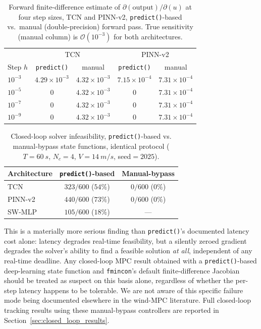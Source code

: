 \begin{table}[H]
\centering
\caption{Forward finite-difference estimate of
$\partial(\text{output})/\partial(u)$ at four step sizes, TCN and
PINN-v2, \texttt{predict()}-based vs.\ manual (double-precision)
forward pass. True sensitivity (manual column) is
$\mathcal{O}(10^{-3})$ for both architectures.}
\label{tab:precision_diagnostic}
\begin{tabular}{lcccc}
\toprule
 & \multicolumn{2}{c}{TCN} & \multicolumn{2}{c}{PINN-v2} \\
Step $h$ & \texttt{predict()} & manual & \texttt{predict()} & manual \\
\midrule
$10^{-3}$ & $4.29\times10^{-3}$ & $4.32\times10^{-3}$ & $7.15\times10^{-4}$ & $7.31\times10^{-4}$ \\
$10^{-5}$ & $0$ & $4.32\times10^{-3}$ & $0$ & $7.31\times10^{-4}$ \\
$10^{-7}$ & $0$ & $4.32\times10^{-3}$ & $0$ & $7.31\times10^{-4}$ \\
$10^{-9}$ & $0$ & $4.32\times10^{-3}$ & $0$ & $7.31\times10^{-4}$ \\
\bottomrule
\end{tabular}
\end{table}

\begin{table}[H]
\centering
\caption{Closed-loop solver infeasibility, \texttt{predict()}-based vs.
manual-bypass state functions, identical protocol ($T=\SI{60}{s}$,
$N_c=4$, $V=\SI{14}{m/s}$, seed$=2025$).}
\label{tab:predict_vs_manual_infeasibility}
\begin{tabular}{lcc}
\toprule
Architecture & \texttt{predict()}-based & Manual-bypass \\
\midrule
TCN      & $323/600$ ($54\%$) & $0/600$ ($0\%$) \\
PINN-v2  & $440/600$ ($73\%$) & $0/600$ ($0\%$) \\
SW-MLP   & $105/600$ ($18\%$) & --- \\
\bottomrule
\end{tabular}
\end{table}

This is a materially more serious finding than
\texttt{predict()}'s documented latency cost alone: latency degrades
real-time feasibility, but a silently zeroed gradient degrades the
solver's ability to find a feasible solution \emph{at all},
independent of any real-time deadline. Any closed-loop MPC result
obtained with a \texttt{predict()}-based deep-learning state function
and \texttt{fmincon}'s default finite-difference Jacobian should be
treated as suspect on this basis alone, regardless of whether the
per-step latency happens to be tolerable. We are not aware of this
specific failure mode being documented elsewhere in the wind-MPC
literature. Full closed-loop tracking
results using these manual-bypass controllers are reported in
Section~\ref{sec:closed_loop_results}.

